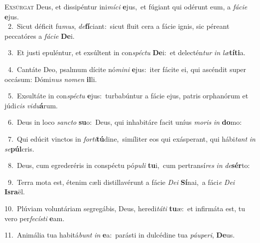 \lettrine{\initial\textcolor{\initialcolor}{E}}{xsúrgat} Deus, et dissipéntur ini\-\textit{mí}\-\textit{ci} \textbf{e}\-jus,~\star et fúgiant qui odérunt eum, a \textit{fá}\-\textit{ci}\textit{e} \textbf{e}\-jus.\\
{\numbfont\textcolor{\numbcolor}{~2.}}~Sicut déficit fu\-\textit{mus}\-, \textit{de}\-\textbf{fí}ciant:~\star sicut fluit cera a fácie ignis, sic péreant peccatóres a \textit{fá}\-\textit{ci}\textit{e} \textbf{De}\-i.\par
{\numbfont\textcolor{\numbcolor}{~3.}}~Et justi epuléntur, et exsúltent in con\-\textit{spéc}\-\textit{tu} \textbf{De}\-i:~\star et delectén\textit{tur} \textit{in} \textit{læ}\-\textbf{tí}\textbf{ti}a.\par
{\numbfont\textcolor{\numbcolor}{~4.}}~Cantáte Deo, psalmum dícite nó\-\textit{mi}\-\textit{ni} \textbf{e}\-jus:~\star iter fácite ei, qui ascéndit super occásum: Dómi\textit{nus} \textit{no}\-\textit{men} \textbf{il}\-li.\par
{\numbfont\textcolor{\numbcolor}{~5.}}~Exsultáte in con\-\textit{spéc}\-\textit{tu} \textbf{e}\-jus:~\star turbabúntur a fácie ejus, patris orphanórum et júdi\textit{cis} \textit{vi}\-\textit{du}\textbf{á}rum.\par
{\numbfont\textcolor{\numbcolor}{~6.}}~Deus in loco \textit{sanc}\-\textit{to} \textbf{su}\-o:~\star Deus, qui inhabitáre facit uníus \textit{mo}\-\textit{ris} \textit{in} \textbf{do}\-mo:\par
{\numbfont\textcolor{\numbcolor}{~7.}}~Qui edúcit vinctos in \textit{for}\-\textit{ti}\textbf{tú}dine,~\star simíliter eos qui exásperant, qui hábi\textit{tant} \textit{in} \textit{se}\-\textbf{púl}cris.\par
{\numbfont\textcolor{\numbcolor}{~8.}}~Deus, cum egrederéris in conspéctu pó\-\textit{pu}\-\textit{li} \textbf{tu}\-i,~\star cum pertransí\textit{res} \textit{in} \textit{de}\-\textbf{sér}to:\par
{\numbfont\textcolor{\numbcolor}{~9.}}~Terra mota est, étenim cæli distillavérunt a fácie \textit{De}\-\textit{i} \textbf{Sí}\-nai,~\star a fáci\textit{e} \textit{De}\-\textit{i} \textbf{Is}\-\textbf{ra}ël.\par
{\numbfont\textcolor{\numbcolor}{10.}}~Plúviam voluntáriam segregábis, Deus, heredi\-\textit{tá}\-\textit{ti} \textbf{tu}\-æ:~\star et infirmáta est, tu vero per\-\textit{fe}\-\textit{cís}\textit{ti} \textbf{e}\-am.\par
{\numbfont\textcolor{\numbcolor}{11.}}~Animália tua habitá\textit{bunt} \textit{in} \textbf{e}\-a:~\star parásti in dulcédine tua \textit{páu}\-\textit{pe}\textit{ri}, \textbf{De}\-us.\par
